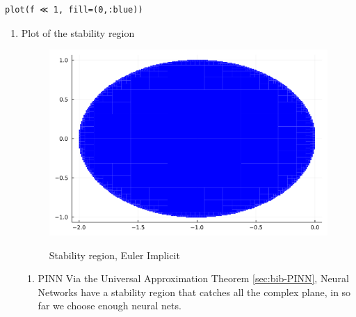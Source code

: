 \documentclass[11pt]{article}
\begin{document}
\begin{enumerate}
\begin{verbatim}
plot(f ≪ 1, fill=(0,:blue))
\end{verbatim}

\begin{enumerate}
\item Plot of the stability region
\label{sec:orgffa2514}
\begin{figure}[!htb]
  \centering
  \caption{\label{fig:stabEI} Stability region, Euler Implicit}
  \includegraphics[width=0.45\linewidth]{Resources/img/curve.png}
  \\ %
\end{figure}
\begin{enumerate}
\item PINN
\label{sec:orgafb5f91}
Via the Universal Approximation Theorem \ref{sec:bib-PINN}, Neural Networks have a
stability region that catches all the complex plane, in so far we choose enough
neural nets.
\end{enumerate}
\end{enumerate}
\end{enumerate}
\end{document}
